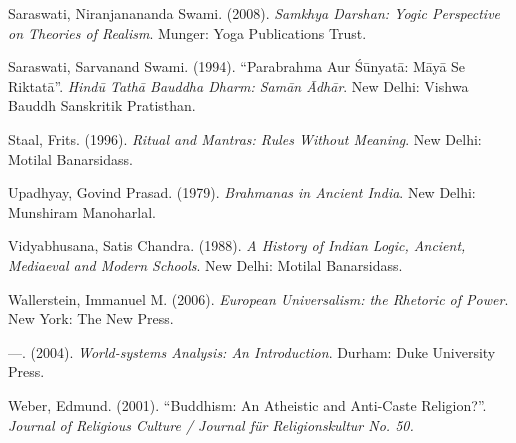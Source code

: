 \begin{thebibliography}{99}
  Saraswati, Niranjanananda Swami. (2008). \textit{Samkhya Darshan: Yogic Perspective on Theories of Realism}. Munger: Yoga Publications Trust.

  Saraswati, Sarvanand Swami. (1994). “Parabrahma Aur Śūnyatā: Māyā Se Riktatā”. \textit{Hindū Tathā Bauddha Dharm: Samān Ādhār}. New Delhi: Vishwa Bauddh Sanskritik Pratisthan.

  Staal, Frits. (1996). \textit{Ritual and Mantras: Rules Without Meaning}. New Delhi: Motilal Banarsidass.

  Upadhyay, Govind Prasad. (1979). \textit{Brahmanas in Ancient India}. New Delhi: Munshiram Manoharlal.

  Vidyabhusana, Satis Chandra. (1988). \textit{A History of Indian Logic, Ancient, Mediaeval and Modern Schools}. New Delhi: Motilal Banarsidass.

  Wallerstein, Immanuel M. (2006). \textit{European Universalism: the Rhetoric of Power}. New York: The New Press.

  ---. (2004). \textit{World-systems Analysis: An Introduction}. Durham: Duke University Press.

  Weber, Edmund. (2001). “Buddhism: An Atheistic and Anti-Caste Religion?”. \textit{Journal of Religious Culture / Journal für Religionskultur No. 50.}

 \end{thebibliography}

\theendnotes

